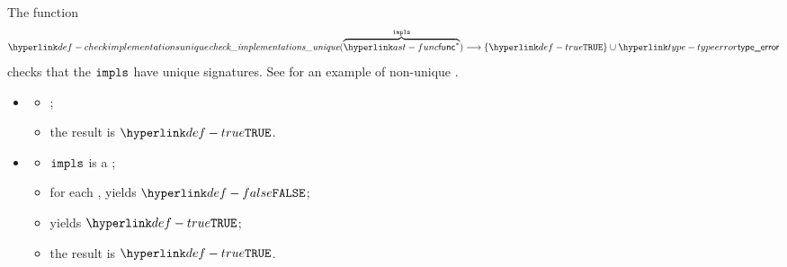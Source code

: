 \FormallyParagraph
\begin{mathpar}
\end{mathpar}

\hypertarget{def-checkimplementationsunique}{}
The function
\[
\checkimplementationsunique(\overname{\func^*}{\vimpls}) \aslto \{\True\} \cup \typeerror
\]
checks that the \Proseimplementationsubprograms{} $\vimpls$ have unique signatures.
\ProseOtherwiseTypeError{}
See  for an example of non-unique \Proseimplementationsubprograms{}.

\ProseParagraph
\OneApplies
\begin{itemize}
  \item {}
    \begin{itemize}
      \item \Proseemptylist{$\vimpls$};
      \item the result is $\True$.
    \end{itemize}
  \item {}
    \begin{itemize}
      \item $\vimpls$ is a \Proselist{$\vh$}{$\vt$};
      \item for each , \Prosesignaturesmatch{$\vh$}{$\vt[i]$} yields $\False$\ProseTerminateAs{\OverridingError};
      \item \Prosecheckimplementationsunique{$\vt$} yields $\True$\ProseOrTypeError;
      \item the result is $\True$.
    \end{itemize}
\end{itemize}

